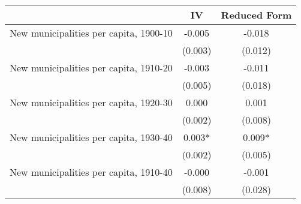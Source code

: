  \begin{tabular}{l*{2}{c}} \toprule
                &\multicolumn{1}{c}{IV}&\multicolumn{1}{c}{Reduced Form}\\
\midrule
New municipalities per capita, 1900-10&   -0.005   &   -0.018   \\
                &  (0.003)   &  (0.012)   \\
\addlinespace
New municipalities per capita, 1910-20&   -0.003   &   -0.011   \\
                &  (0.005)   &  (0.018)   \\
\addlinespace
New municipalities per capita, 1920-30&    0.000   &    0.001   \\
                &  (0.002)   &  (0.008)   \\
\addlinespace
New municipalities per capita, 1930-40&    0.003*  &    0.009*  \\
                &  (0.002)   &  (0.005)   \\
\addlinespace
New municipalities per capita, 1910-40&   -0.000   &   -0.001   \\
                &  (0.008)   &  (0.028)   \\
       \bottomrule \end{tabular}
